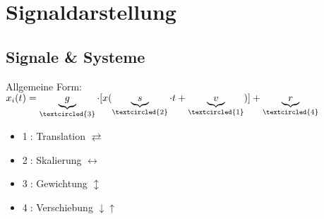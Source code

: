 \documentclass[german]{latex4ei/latex4ei_sheet}
\begin{document}
	\section{Signaldarstellung}
	\begin{sectionbox}
	\subsection{Signale \& Systeme}
	Allgemeine Form: $x_i(t) = \underbrace{g}_{\textcircled{3}} \cdot [x(\underbrace{s}_{\textcircled{2}} \cdot t + \underbrace{v}_{\textcircled{1}})] + \underbrace{r}_{\textcircled{4}}$
	\begin{itemize}
		\item \textcircled{1}: Translation $\rightleftarrows$
		\item \textcircled{2}: Skalierung $\longleftrightarrow$
		\item \textcircled{3}: Gewichtung $\updownarrow$
		\item \textcircled{4}: Verschiebung $\downarrow\uparrow$
	\end{itemize}
	\end{sectionbox}
\end{document}
